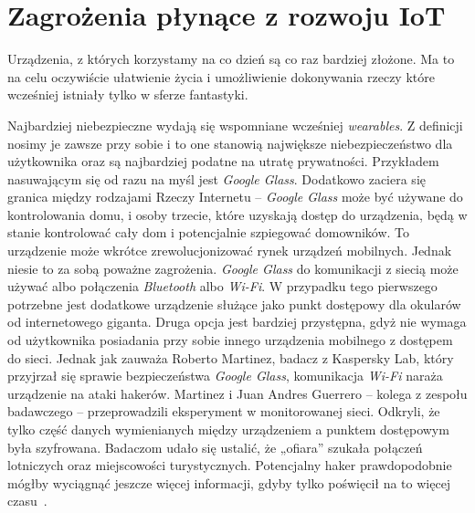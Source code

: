 \documentclass[brudnopis]{xmgr}
\begin{document}

\section{Zagrożenia płynące z rozwoju IoT}
Urządzenia, z których korzystamy na co dzień są co raz bardziej złożone. Ma to na celu oczywiście ułatwienie życia i umożliwienie dokonywania rzeczy które wcześniej istniały tylko w sferze fantastyki. 

Najbardziej niebezpieczne wydają się wspomniane wcześniej \emph{wearables}. Z definicji nosimy je zawsze przy sobie i to one stanowią największe niebezpieczeństwo dla użytkownika oraz są najbardziej podatne na utratę prywatności. Przykładem nasuwającym się od razu na myśl jest \emph{Google Glass}. Dodatkowo zaciera się granica między rodzajami Rzeczy Internetu – \emph{Google Glass} może być używane do kontrolowania domu, i osoby trzecie, które uzyskają dostęp do urządzenia, będą w stanie kontrolować cały dom i potencjalnie szpiegować domowników.
To urządzenie może wkrótce zrewolucjonizować rynek urządzeń mobilnych. Jednak niesie to za sobą poważne zagrożenia. \emph{Google Glass} do komunikacji z siecią może używać albo połączenia \emph{Bluetooth} albo \emph{Wi-Fi}. W przypadku tego pierwszego potrzebne jest dodatkowe urządzenie służące jako punkt dostępowy dla okularów od internetowego giganta. Druga opcja jest bardziej przystępna, gdyż nie wymaga od użytkownika posiadania przy sobie innego urządzenia mobilnego z dostępem do sieci. Jednak jak zauważa Roberto Martinez, badacz z Kaspersky Lab, który przyjrzał się sprawie bezpieczeństwa \emph{Google Glass}, komunikacja \emph{Wi-Fi} naraża urządzenie na ataki hakerów. Martinez i Juan Andres Guerrero – kolega z zespołu badawczego – przeprowadzili eksperyment w monitorowanej sieci. Odkryli, że tylko część danych wymienianych między urządzeniem a punktem dostępowym była szyfrowana. Badaczom udało się ustalić, że „ofiara” szukała połączeń lotniczych oraz miejscowości turystycznych. Potencjalny haker prawdopodobnie mógłby wyciągnąć jeszcze więcej informacji, gdyby tylko poświęcił na to więcej czasu~\cite{Abusing}.
\end{document}
